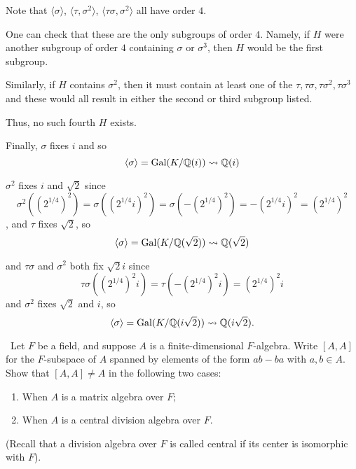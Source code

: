 \documentclass[12pt]{AlgebraQual}
\begin{document}
\begin{solution}
Note that $\langle\sigma\rangle$, $\langle\tau,\sigma^2\rangle$, $\langle \tau\sigma,\sigma^2\rangle$ all have order $4$.

One can check that these are the only subgroups of order $4$. Namely, if $H$ were another subgroup of order $4$ containing $\sigma$ or $\sigma^3$, then $H$ would be the first subgroup.

Similarly, if $H$ contains $\sigma^2$, then it must contain at least one of the $\tau,\tau\sigma,\tau\sigma^2,\tau\sigma^3$ and these would all result in either the second or third subgroup listed.

Thus, no such fourth $H$ exists.

Finally, $\sigma$ fixes $i$ and so $$\langle\sigma\rangle=\text{Gal}(K/\mathbb{Q}(i))\leadsto \mathbb{Q}(i)$$

$\sigma^2$ fixes $i$ and $\sqrt{2}$ since $$\sigma^2((2^{1/4})^2)=\sigma((2^{1/4}i)^2)=\sigma(-(2^{1/4})^2)=-(2^{1/4}i)^2=(2^{1/4})^2$$, and $\tau$ fixes $\sqrt{2}$, so $$\langle\sigma\rangle=\text{Gal}(K/\mathbb{Q}(\sqrt{2}))\leadsto \mathbb{Q}(\sqrt{2})$$

and $\tau\sigma$ and $\sigma^2$ both fix $\sqrt{2}i$ since $$\tau\sigma((2^{1/4})^2i)=\tau(-(2^{1/4})^2i)=(2^{1/4})^2i$$ and $\sigma^2$ fixes $\sqrt{2}$ and $i$, so $$\langle\sigma\rangle=\text{Gal}(K/\mathbb{Q}(i\sqrt{2}))\leadsto \mathbb{Q}(i\sqrt{2}).$$
\end{solution}
\newpage



\begin{problem} $\,$
Let $F$ be a field, and suppose $A$ is a finite-dimensional $F$-algebra. Write $[A,A]$ for the $F$-subspace of $A$ spanned by elements of the form $ab-ba$ with $a,b\in A$. Show that $[A,A]\not=A$ in the following two cases:
\begin{enumerate}[label=(\alph*)]
    \item When $A$ is a matrix algebra over $F;$
    \item When $A$ is a central division algebra over $F.$
\end{enumerate} (Recall that a division algebra over $F$ is called central if its center is isomorphic with $F$).
\end{problem}
\end{document}
